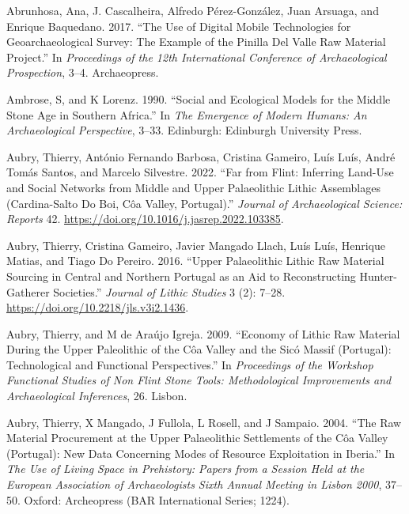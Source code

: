 \documentclass[
  a4paper,
  DIV=11,
  numbers=noendperiod]{scrreprt}
\newlength{\cslhangindent}
\newenvironment{CSLReferences}[2] %
 {\begin{list}{}{%
  \setlength{\itemindent}{0pt}
  \setlength{\leftmargin}{0pt}
  \setlength{\parsep}{0pt}
  \ifodd #1
   \setlength{\leftmargin}{\cslhangindent}
   \setlength{\itemindent}{-1\cslhangindent}
  \fi
  \setlength{\itemsep}{#2\baselineskip}}}
 {\end{list}}
\begin{document}
\label{refs}
\begin{CSLReferences}{1}{0}
Abrunhosa, Ana, J. Cascalheira, Alfredo Pérez-González, Juan Arsuaga,
and Enrique Baquedano. 2017. {``The Use of Digital Mobile Technologies
for Geoarchaeological Survey: {The} Example of the {Pinilla} Del {Valle}
Raw Material Project.''} In \emph{Proceedings of the 12th {International
Conference} of {Archaeological Prospection}}, 3--4. Archaeopress.

Ambrose, S, and K Lorenz. 1990. {``Social and Ecological Models for the
Middle Stone Age in Southern {Africa}.''} In \emph{The Emergence of
Modern Humans: An Archaeological Perspective}, 3--33. Edinburgh:
Edinburgh University Press.

Aubry, Thierry, António Fernando Barbosa, Cristina Gameiro, Luís Luís,
André Tomás Santos, and Marcelo Silvestre. 2022. {``Far from Flint:
{Inferring} Land-Use and Social Networks from {Middle} and {Upper
Palaeolithic} Lithic Assemblages ({Cardina-Salto} Do {Boi}, {C{ô}a
Valley}, {Portugal}).''} \emph{Journal of Archaeological Science:
Reports} 42. \url{https://doi.org/10.1016/j.jasrep.2022.103385}.

Aubry, Thierry, Cristina Gameiro, Javier Mangado Llach, Luís Luís,
Henrique Matias, and Tiago Do Pereiro. 2016. {``Upper {Palaeolithic}
Lithic Raw Material Sourcing in {Central} and {Northern Portugal} as an
Aid to Reconstructing Hunter-Gatherer Societies.''} \emph{Journal of
Lithic Studies} 3 (2): 7--28.
\url{https://doi.org/10.2218/jls.v3i2.1436}.

Aubry, Thierry, and M de Araújo Igreja. 2009. {``Economy of Lithic Raw
Material During the {Upper Paleolithic} of the {C{ô}a Valley} and the
{Sic{ó} Massif} ({Portugal}): Technological and Functional
Perspectives.''} In \emph{Proceedings of the {Workshop Functional
Studies} of {Non Flint Stone Tools}: {Methodological Improvements} and
{Archaeological Inferences}}, 26. Lisbon.

Aubry, Thierry, X Mangado, J Fullola, L Rosell, and J Sampaio. 2004.
{``The Raw Material Procurement at the {Upper Palaeolithic} Settlements
of the {C{ô}a Valley} ({Portugal}): New Data Concerning Modes of
Resource Exploitation in {Iberia}.''} In \emph{The {Use} of {Living
Space} in {Prehistory}: {Papers} from a Session Held at the {European
Association} of {Archaeologists Sixth Annual Meeting} in {Lisbon} 2000},
37--50. Oxford: Archeopress (BAR International Series; 1224).


\end{CSLReferences}
\end{document}
